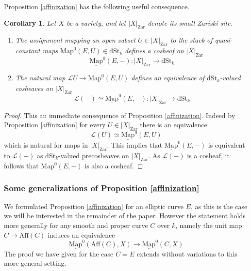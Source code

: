 \documentclass[11pt,letterpaper]{amsart}
\newtheorem{corollary}[dummy]{Corollary}
\newcommand{\cL}{\mathcal{L}}
\newcommand{\Mapo}[2]{\underline{\mathrm{Map}}^{0}\left (#1,#2\right )}
\newcommand{\dStk}{\mathrm{dSt}_{k}}
\newcommand{\Zar}[1]{|#1|_{\mathrm{Zar}}}
\begin{document}
 
Proposition \ref{affinization} has the following useful consequence. 


\begin{corollary}\label{corollary:LoopstackequalsMapo}
Let $X$ be a variety, and let $\Zar{X}$ denote its small Zariski site. 
\begin{enumerate}
\item The assignment mapping an open subset 
$
U \in \Zar{X}$ to the stack of quasi-constant maps $\Mapo{E}{U} \in \dStk$  
defines a cosheaf on $\Zar{X}$
$$
\Mapo{E}{-}: \Zar{X} \rightarrow\dStk
$$
\item The natural map $\cL U \to \Mapo{E}{U}$ defines an equivalence of $\dStk$-valued cosheaves on $\Zar{X}$
$$
\cL(-) \simeq \Mapo{E}{-}:  \Zar{X} \rightarrow\dStk
$$
\end{enumerate}
\end{corollary}
\begin{proof}
This an immediate consequence of Proposition \ref{affinization}.  Indeed by Proposition \ref{affinization} for every $U \in \Zar{X}$ there is an equivalence 
$$
\cL(U) \simeq \Mapo{E}{U}
$$
which is natural for maps in $\Zar{X}$. This implies that $\Mapo{E}{-}$ is equivalent to $\cL(-)$ as $\dStk$-valued precosheaves on $\Zar{X}$. As $\cL(-)$ is a cosheaf, it follows that $\Mapo{E}{-}$ is also a cosheaf. 
\end{proof}
 
\subsubsection{Some generalizations of Proposition \ref{affinization}}
\label{sec:general}
We formulated Proposition \ref{affinization} for an elliptic curve $E$, as this is the case we will be interested in the remainder of the paper. However the statement holds more generally for any smooth and proper curve $C$ over $k$, namely the unit map $C \to \mathrm{Aff}(C)$ induces  an equivalence 
$$
\Mapo{\mathrm{Aff}(C)}{X} \to \Mapo{C}{X}
$$
The proof we have given for the case $C=E$ extends without variations to this more  general setting.  
\end{document}
